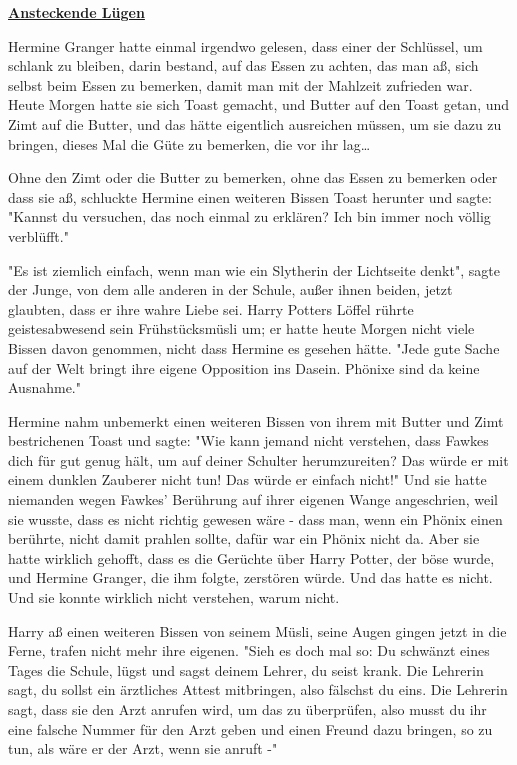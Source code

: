 

\hypertarget{ansteckende-luxfcgen}{%

\textbf{\uline{Ansteckende Lügen}}

Hermine Granger hatte einmal irgendwo gelesen, dass einer der Schlüssel, um schlank zu bleiben, darin bestand, auf das Essen zu achten, das man aß, sich selbst beim Essen zu bemerken, damit man mit der Mahlzeit zufrieden war. Heute Morgen hatte sie sich Toast gemacht, und Butter auf den Toast getan, und Zimt auf die Butter, und das hätte eigentlich ausreichen müssen, um sie dazu zu bringen, dieses Mal die Güte zu bemerken, die vor ihr lag…

Ohne den Zimt oder die Butter zu bemerken, ohne das Essen zu bemerken oder dass sie aß, schluckte Hermine einen weiteren Bissen Toast herunter und sagte: "Kannst du versuchen, das noch einmal zu erklären? Ich bin immer noch völlig verblüfft."

"Es ist ziemlich einfach, wenn man wie ein Slytherin der Lichtseite denkt", sagte der Junge, von dem alle anderen in der Schule, außer ihnen beiden, jetzt glaubten, dass er ihre wahre Liebe sei. Harry Potters Löffel rührte geistesabwesend sein Frühstücksmüsli um; er hatte heute Morgen nicht viele Bissen davon genommen, nicht dass Hermine es gesehen hätte. "Jede gute Sache auf der Welt bringt ihre eigene Opposition ins Dasein. Phönixe sind da keine Ausnahme."

Hermine nahm unbemerkt einen weiteren Bissen von ihrem mit Butter und Zimt bestrichenen Toast und sagte: "Wie kann jemand nicht verstehen, dass Fawkes dich für gut genug hält, um auf deiner Schulter herumzureiten? Das würde er mit einem dunklen Zauberer nicht tun! Das würde er einfach nicht!" Und sie hatte niemanden wegen Fawkes' Berührung auf ihrer eigenen Wange angeschrien, weil sie wusste, dass es nicht richtig gewesen wäre - dass man, wenn ein Phönix einen berührte, nicht damit prahlen sollte, dafür war ein Phönix nicht da. Aber sie hatte wirklich gehofft, dass es die Gerüchte über Harry Potter, der böse wurde, und Hermine Granger, die ihm folgte, zerstören würde. Und das hatte es nicht. Und sie konnte wirklich nicht verstehen, warum nicht.

Harry aß einen weiteren Bissen von seinem Müsli, seine Augen gingen jetzt in die Ferne, trafen nicht mehr ihre eigenen. "Sieh es doch mal so: Du schwänzt eines Tages die Schule, lügst und sagst deinem Lehrer, du seist krank. Die Lehrerin sagt, du sollst ein ärztliches Attest mitbringen, also fälschst du eins. Die Lehrerin sagt, dass sie den Arzt anrufen wird, um das zu überprüfen, also musst du ihr eine falsche Nummer für den Arzt geben und einen Freund dazu bringen, so zu tun, als wäre er der Arzt, wenn sie anruft -"

}
